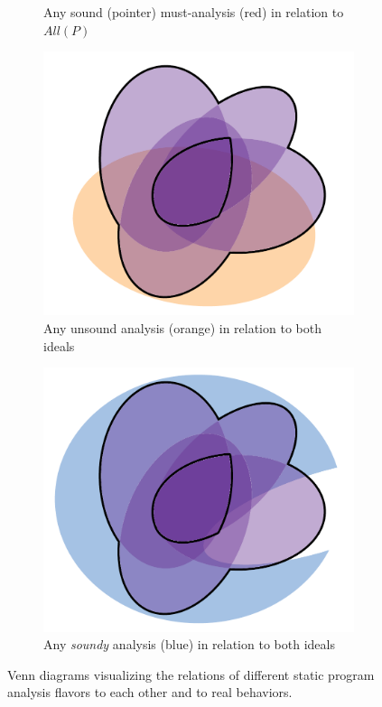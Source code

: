 \begin{figure}[htb!]
\begin{subfigure}{.47\textwidth}
    \caption{Any sound (pointer) must-analysis (red) in relation to $All(P)$}
    \label{fig:back:soundness-d}
\end{subfigure}
\begin{subfigure}{.47\textwidth}
    \includegraphics[scale=.45]{assets/background/venn-soundness-e.pdf}
    \caption{Any unsound analysis (orange) in relation to both ideals}
    \label{fig:back:soundness-e}
\end{subfigure}
\hfill
\begin{subfigure}{.47\textwidth}
    \includegraphics[scale=.45]{assets/background/venn-soundness-f.pdf}
    \caption{Any \emph{soundy} analysis (blue) in relation to both ideals}
    \label{fig:back:soundness-f}
\end{subfigure}
\caption[Venn diagrams visualizing different program analysis notions and flavors]{Venn diagrams visualizing the relations of different static program analysis flavors to each other and to real behaviors.}
\label{fig:back:soundness}
\end{figure}

